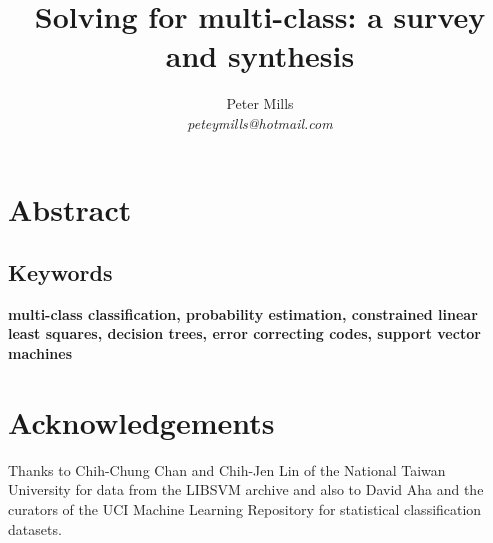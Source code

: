 \documentclass{article}
\begin{document}
\title{Solving for multi-class: a survey and synthesis}

\author{Peter Mills\\\textit{peteymills@hotmail.com}}

\maketitle

\begin{center}
	\setlength{\fboxsep}{0pt}
	\setlength{\fboxrule}{1pt}
\end{center}

\section*{Abstract}



\subsection*{Keywords}
\textbf{multi-class classification,
probability estimation,
constrained linear least squares,
decision trees,
error correcting codes,
support vector machines}

\tableofcontents



\appendix

\section*{Acknowledgements}

Thanks to Chih-Chung Chan and Chih-Jen Lin of the National Taiwan University
for data from the LIBSVM archive and also to David Aha and the curators of
the UCI Machine Learning Repository for statistical classification datasets.


%
\end{document}
